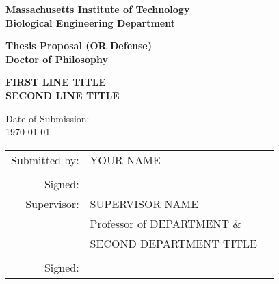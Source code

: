\begin{center}
	{\LARGE\bf Massachusetts Institute of Technology \\
	\vspace{0.25\baselineskip}
	Biological Engineering Department}	
	\vspace{\baselineskip}
	
	{\Large\bf Thesis Proposal (OR Defense) \\
	\vspace{0.25\baselineskip}
	Doctor of Philosophy}		
	\vspace{4\baselineskip}

	\vspace{2\baselineskip}	
	{\LARGE\bf FIRST LINE TITLE \\
			   \vspace{0.25\baselineskip}
			   SECOND LINE TITLE}
	\vspace{3\baselineskip}

	Date of Submission: \\	
	\vspace{0.5\baselineskip}
	\today
		
	\vspace{8\baselineskip}	
		
	\begin{tabular}{rlc}
		{\small \sc Submitted by:}
	        	                    & YOUR NAME  & \\
		\\ %
		{\small \sc Signed:} & \cline{1-1} \\ 
			
		{\small \sc Supervisor:}
	        	                    & SUPERVISOR NAME  & \\
	            	                & Professor of DEPARTMENT \& & \\
	            	                & SECOND DEPARTMENT TITLE & \\
		\\ %
		{\small \sc Signed:} & \cline{1-1} \\
	                         

\end{tabular}
\end{center}
